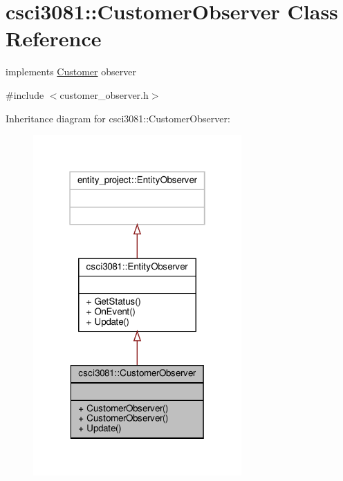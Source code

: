 \hypertarget{classcsci3081_1_1CustomerObserver}{}\section{csci3081\+:\+:Customer\+Observer Class Reference}
\label{classcsci3081_1_1CustomerObserver}


implements \hyperlink{classcsci3081_1_1Customer}{Customer} observer  




{\ttfamily \#include $<$customer\+\_\+observer.\+h$>$}



Inheritance diagram for csci3081\+:\+:Customer\+Observer\+:
\nopagebreak
\begin{figure}[H]
\begin{center}
\leavevmode
\includegraphics[width=226pt]{classcsci3081_1_1CustomerObserver__inherit__graph}
\end{center}
\end{figure}


